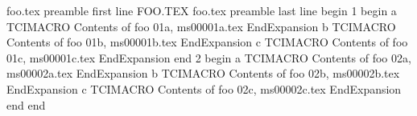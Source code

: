 foo.tex preamble first line
        FOO.TEX
foo.tex preamble last line
begin
1
begin
a
TCIMACRO
Contents of foo 01a, ms00001a.tex
EndExpansion
b
TCIMACRO
Contents of foo 01b, ms00001b.tex
EndExpansion
c
TCIMACRO
Contents of foo 01c, ms00001c.tex
EndExpansion
end
2
begin
a
TCIMACRO
Contents of foo 02a, ms00002a.tex
EndExpansion
b
TCIMACRO
Contents of foo 02b, ms00002b.tex
EndExpansion
c
TCIMACRO
Contents of foo 02c, ms00002c.tex
EndExpansion
end
end
